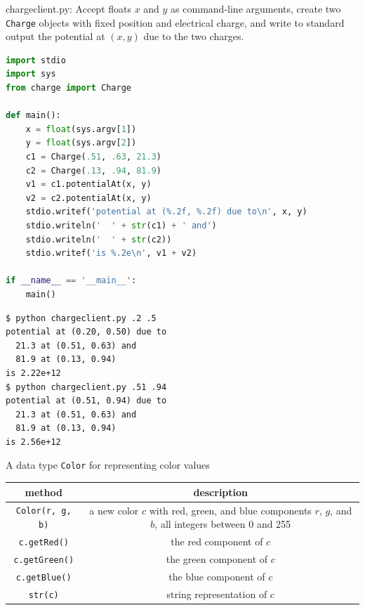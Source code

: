 \documentclass[8pt,a4paper,compress]{beamer}
\begin{document}
\begin{frame}[fragile]
\pause

\begin{framed}
\tiny chargeclient.py: Accept floats $x$ and $y$ as command-line arguments, create two \lstinline{Charge} objects with fixed position and electrical charge, and write to standard output the potential at $(x, y)$ due to the two charges.
\end{framed}

\begin{lstlisting}[language=Python]
import stdio
import sys
from charge import Charge

def main():
    x = float(sys.argv[1])
    y = float(sys.argv[2])
    c1 = Charge(.51, .63, 21.3)
    c2 = Charge(.13, .94, 81.9)
    v1 = c1.potentialAt(x, y)
    v2 = c2.potentialAt(x, y)
    stdio.writef('potential at (%.2f, %.2f) due to\n', x, y)
    stdio.writeln('  ' + str(c1) + ' and')
    stdio.writeln('  ' + str(c2))
    stdio.writef('is %.2e\n', v1 + v2)

if __name__ == '__main__':
    main()
\end{lstlisting}

\pause

\begin{lstlisting}[language={}]
$ python chargeclient.py .2 .5
potential at (0.20, 0.50) due to
  21.3 at (0.51, 0.63) and
  81.9 at (0.13, 0.94)
is 2.22e+12
$ python chargeclient.py .51 .94
potential at (0.51, 0.94) due to
  21.3 at (0.51, 0.63) and
  81.9 at (0.13, 0.94)
is 2.56e+12
\end{lstlisting}
\end{frame}

\begin{frame}[fragile]
\pause

A data type \lstinline{Color} for representing color values
\begin{center}
\begin{tabular}{cc}
method & description \\ \hline
\lstinline$Color(r, g, b)$ & \makecell{a new color $c$ with red, green, and blue components \\ $r$, $g$, and $b$, all integers between 0 and 255} \\
\lstinline$c.getRed()$ & the red component of $c$ \\
\lstinline$c.getGreen()$ & the green component of $c$ \\
\lstinline$c.getBlue()$ & the blue component of $c$ \\
\lstinline$str(c)$ & string representation of $c$
\end{tabular} 
\end{center}
\end{frame}
\end{document}
